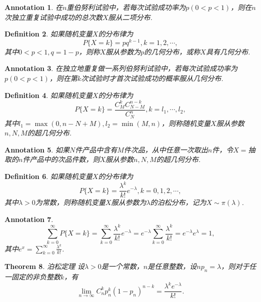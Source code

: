\documentclass{article}
\newtheorem{theorem}{Theorem}[section]
\newtheorem{definition}[theorem]{Definition}
\newtheorem{annotation}[theorem]{Annotation}
\begin{document}
\begin{annotation}
\rm 在$n$重伯努利试验中，若每次试验成功率为$p(0 < p < 1)$，则在$n$次独立重复试验中成功的总次数$X$服从二项分布.
\end{annotation}

\begin{definition}
\rm 如果随机变量$X$的分布律为
$$
P\{X=k\} = pq^{k-1}, k =1,2,\cdots,
$$
其中$0 < p < 1, q= 1- p$，则称$X$服从参数为$p$的几何分布，或称$X$具有几何分布.
\end{definition}

\begin{annotation}
\rm 在独立地重复做一系列伯努利试验中，若每次试验成功率为$p(0 < p < 1)$，则在第$k$次试验时才首次试验成功的概率服从几何分布.
\end{annotation}

\begin{definition}
\rm 如果随机变量$X$的分布律为
$$
P\{X=k\} = \frac{C_M^kC_{N-M}^{n-k}}{C_{N}^n}, k=l_1,\cdots,l_2,
$$
其中$l_1 = \max(0,n-N+M), l_2 = \min(M,n)$，则称随机变量$X$服从参数$n,N,M$的超几何分布.
\end{definition}

\begin{annotation}
\rm 如果$N$件产品中含有$M$件次品，从中任意一次取出$n$件，令$X=$抽取的$n$件产品中的次品件数，则$X$服从参数$n,N,M$的超几何分布. 
\end{annotation}

\begin{definition}
\rm 如果随机变量$X$的分布律为
$$
P\{X=k\} = \frac{\lambda^k}{k!}e^{-\lambda}, k = 0,1,2,\cdots,
$$
其中$\lambda > 0$为常数，则称随机变量$X$服从参数为$\lambda$的泊松分布，记为$X \sim \pi(\lambda)$. 
\end{definition}

\begin{annotation}
\rm 
$$
\sum\limits_{k=0}^{\infty} P\{X =k\} = \sum\limits_{k=0}^{\infty}\frac{\lambda^k}{k!}e^{-\lambda} = e^{-\lambda}\sum\limits_{k=0}^{\infty}\frac{\lambda^k}{k!} = e^{-\lambda}e^{\lambda} = 1,
$$
其中$e^x = \sum\limits_{k=0}^{\infty}\frac{\lambda^k}{k!}$.
\end{annotation}

\begin{theorem}
\rm {\color{red} 泊松定理} 设$\lambda > 0$是一个常数，$n$是任意整数，设$np_n = \lambda$，则对于任一固定的非负整数$k$，有
$$
\lim\limits_{n \rightarrow \infty}C_n^kp_n^k(1-p_n)^{n-k} = \frac{\lambda^ke^{-\lambda}}{k!}.
$$
\end{theorem}
\end{document}
